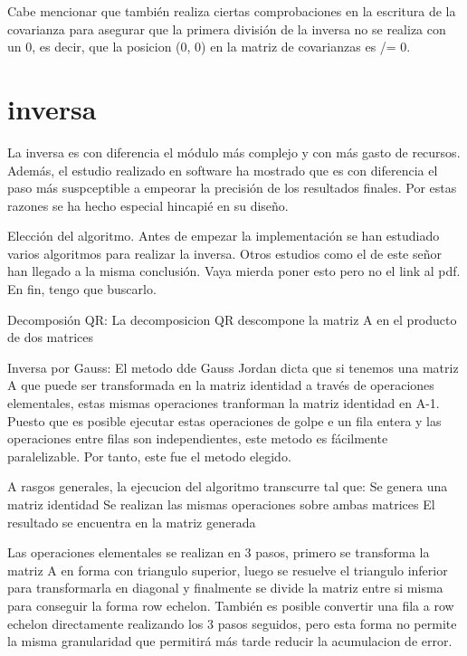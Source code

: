 Cabe mencionar que también realiza ciertas comprobaciones en la escritura de la covarianza para asegurar que la primera división de la inversa no se realiza con un 0, es decir, que la posicion (0, 0) en la matriz de covarianzas es /= 0.

\section{inversa}
La inversa es con diferencia el módulo más complejo y con más gasto de recursos. Además, el estudio realizado en software ha mostrado que es con diferencia el paso más suspceptible a empeorar la precisión de los resultados finales. Por estas razones se ha hecho especial hincapié en su diseño.

Elección del algoritmo.
Antes de empezar la implementación se han estudiado varios algoritmos para realizar la inversa.
Otros estudios como el de este señor han llegado a la misma conclusión. Vaya mierda poner esto pero no el link al pdf. En fin, tengo que buscarlo.

Decomposión QR:
La decomposicion QR descompone la matriz A en el producto de dos matrices %

Inversa por Gauss:
El metodo dde Gauss Jordan dicta que si tenemos una matriz A que puede ser transformada en la matriz identidad a través de operaciones elementales, estas mismas operaciones tranforman la matriz identidad en A-1. Puesto que es posible ejecutar estas operaciones de golpe e un fila entera y las operaciones entre filas son independientes, este metodo es fácilmente paralelizable.
Por tanto, este fue el metodo elegido.

A rasgos generales, la ejecucion del algoritmo transcurre tal que:
	Se genera una matriz identidad
	Se realizan las mismas operaciones sobre ambas matrices
	El resultado se encuentra en la matriz generada

Las operaciones elementales se realizan en 3 pasos, primero se transforma la matriz A en forma con triangulo superior, luego se resuelve el triangulo inferior para transformarla en diagonal y finalmente se divide la matriz entre si misma para conseguir la forma row echelon.
También es posible convertir una fila a row echelon directamente realizando los 3 pasos seguidos, pero esta forma no permite la misma granularidad que permitirá más tarde reducir la acumulacion de error.

